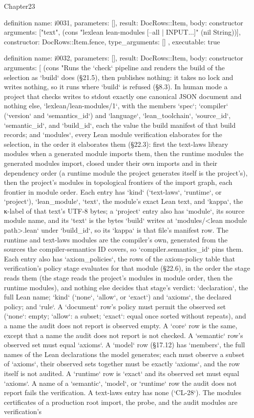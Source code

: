 \begin{lexlean}{Chapter23}
\begin{semanticmodule}
definition{
  name: i0031,
  parameters: [],
  result: DocRows::Item,
  body: constructor{
    arguments: ["text", (cons "lexlean lean-modules [--all | INPUT...]" (nil String))],
    constructor: DocRows::Item.fence,
    type_arguments: []
  },
  executable: true
}

definition{
  name: i0032,
  parameters: [],
  result: DocRows::Item,
  body: constructor{
    arguments: [
      (cons "Runs the `check` pipeline and renders the build of the selection as `build` does (§21.5), then publishes nothing: it takes no lock and writes nothing, so it runs where `build` is refused (§8.3). In human mode a project that checks writes to stdout exactly one canonical JSON document and nothing else, `lexlean/lean-modules/1`, with the members `spec`; `compiler` (`version` and `semantics_id`) and `language`, `lean_toolchain`, `source_id`, `semantic_id`, and `build_id`, each the value the build manifest of that build records; and `modules`, every Lean module verification elaborates for the selection, in the order it elaborates them (§22.3): first the text-laws library modules when a generated module imports them, then the runtime modules the generated modules import, closed under their own imports and in their dependency order (a runtime module the project generates itself is the project's), then the project's modules in topological frontiers of the import graph, each frontier in module order. Each entry has `kind` (`text-laws`, `runtime`, or `project`), `lean_module`, `text`, the module's exact Lean text, and `kappa`, the κ-label of that text's UTF-8 bytes; a `project` entry also has `module`, its source module name, and its `text` is the bytes `build` writes at `modules/<lean module path>.lean` under `build_id`, so its `kappa` is that file's manifest row. The runtime and text-laws modules are the compiler's own, generated from the sources the compiler-semantics ID covers, so `compiler.semantics_id` pins them. Each entry also has `axiom_policies`, the rows of the axiom-policy table that verification's policy stage evaluates for that module (§22.6), in the order the stage reads them (the stage reads the project's modules in module order, then the runtime modules), and nothing else decides that stage's verdict: `declaration`, the full Lean name; `kind` (`none`, `allow`, or `exact`) and `axioms`, the declared policy; and `rule`. A `document` row's policy must permit the observed set (`none`: empty; `allow`: a subset; `exact`: equal once sorted without repeats), and a name the audit does not report is observed empty. A `core` row is the same, except that a name the audit does not report is not checked. A `semantic` row's observed set must equal `axioms`. A `model` row (§17.12) has `members`, the full names of the Lean declarations the model generates; each must observe a subset of `axioms`, their observed sets together must be exactly `axioms`, and the row itself is not audited. A `runtime` row is `exact` and its observed set must equal `axioms`. A name of a `semantic`, `model`, or `runtime` row the audit does not report fails the verification. A text-laws entry has none (`CL-28`). The modules certificates of a production root import, the probe, and the audit modules are verification's }}
\end{semanticmodule}
\end{lexlean}
